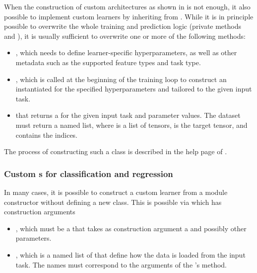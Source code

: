 \documentclass[article]{jss}
\theoremstyle{definition}
\begin{document}
When the construction of custom architectures as shown in  is not enough, it also possible to implement custom learners by inheriting from .
While it is in principle possible to overwrite the whole training and prediction logic (private methods  and ), it is usually sufficient to overwrite one or more of the following methods:
\begin{itemize}
    \item {}, which needs to define learner-specific hyperparameters, as well as other metadata such as the supported feature types and task type.
    \item {}, which is called at the beginning of the training loop to construct an instantiated  for the specified hyperparameters and tailored to the given input task.
    \item {} that returns a  for the given input task and parameter values. The dataset must return a named list, where  is a list of tensors,  is the target tensor, and  contains the indices.
\end{itemize}

The process of constructing such a class is described in the help page of .

\subsubsection[Custom Learners for classification and regression]{Custom s for classification and regression}\label{sec:extending-learner}

In many cases, it is possible to construct a custom learner from a module constructor without defining a new class.
This is possible via  which has construction arguments
\begin{itemize}
    \item {}, which must be a  that takes as construction argument a  and possibly other parameters.
    \item {}, which is a named list of  that define how the data is loaded from the input task. The names must correspond to the arguments of the 's  method.
\end{itemize}
\end{document}
